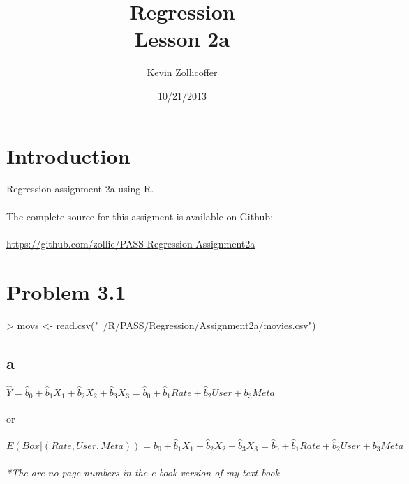 \documentclass{article}
\author{Kevin Zollicoffer}
\title{Regression\\Lesson 2a}
\date{10/21/2013}
\begin{document}
\maketitle


\section*{Introduction}
Regression assignment 2a using R. 
\\
\\
The complete source for this assigment is available on Github:
\\
\\
\url{https://github.com/zollie/PASS-Regression-Assignment2a}

\section*{Problem 3.1}
\begin{Schunk}
\begin{Sinput}
> movs <- read.csv("~/R/PASS/Regression/Assignment2a/movies.csv")
\end{Sinput}
\end{Schunk}

\subsection*{a}
$\hat{Y} = \hat{b}_0+\hat{b}_1X_1+\hat{b}_2X_2+\hat{b}_3X_3 = \hat{b}_0+\hat{b}_1Rate+\hat{b}_2User+b_3Meta$
\\\\
or
\\\\
$E(Box|(Rate,User,Meta)) =  \hat{b}_0+\hat{b}_1X_1+\hat{b}_2X_2+\hat{b}_3X_3 = \hat{b}_0+\hat{b}_1Rate+\hat{b}_2User+b_3Meta$
\\\\
\textit{*The are no page numbers in the e-book version of my text book}
\end{document}

